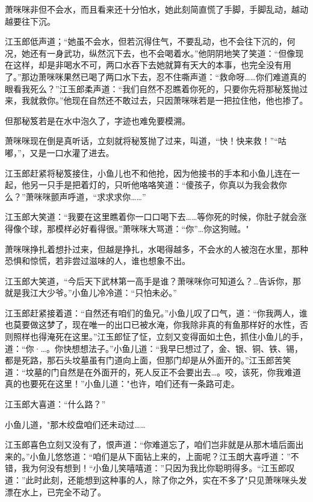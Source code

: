 \documentclass[12pt,oneside]{book}
\begin{document}
萧咪咪非但不会水，而且看来还十分怕水，她此刻简直慌了手脚，手脚乱动，越动越要往下沉。

江玉郎低声道；``她虽不会水，但若沉得住气，不要乱动，也不会往下沉的，何况，她还有一身武功，纵然沉下去，也不会喝着水。''他阴阴地笑了笑道：``但像现在这样，却是非喝水不可，两口水吞下去她就算有天大的本事，也完全没有用了。''那边萧咪咪果然已喝了两口水下去，忍不住嘶声道：``救命呀\ldots\ldots 你们难道真的眼看我死么？''江玉郎柔声道：``我们自然不忍瞧着你死的，只要你先将那秘笈抛过来，我就救你。''他现在自然还不敢过去，只因萧咪咪若是一把拉住他，他也掺了。

但那秘笈若是在水中泡久了，字迹也难免要模溯。

萧咪咪现在倒是真听话，立刻就将秘笈抛了过来，叫道，``快！快来救！''``咕嘟，''，又是一口水灌了进去。

江玉郎赶紧将秘笈接住，小鱼儿也不和他抢，因为他接书的手本和小鱼儿连在一起，他另一只手是把着灯的，只听他咯咯笑道：``傻孩子，你真以为我会救你么？''萧咪咪颤声呼道，``求求求你\ldots\ldots{}''

江玉郎大笑道：``我要在这里瞧着你一口口喝下去\ldots\ldots 等你死的时候，你肚子就会涨得像个球，那模样必好看得很。''萧咪咪大骂道：``你''\ldots 你这狗贼。"

萧咪咪挣扎着想扑过来，但越是挣扎，水喝得越多，不会水的人被泡在水里，那种恐惧和惊慌，若非尝过滋味的人，谁也想象不出。

江玉郎大笑道，``今后天下武林第一高手是谁？萧咪咪你可知道么？\ldots 告诉你，那就是我江大少爷。''小鱼儿冷冷道：``只怕未必。''

江玉郎赶紧接着道：``自然还有咱们的鱼兄。''小鱼儿叹了口气，道：``你我两人，谁也莫要做这梦了，现在唯一的出口已被水淹，你我除非真的有鱼那样好的水性，否则照样也得淹死在这里。''江玉郎怔了怔，立刻又变得面如土色，抓住小鱼儿的手，道：``你·\ldots。你快想想法子。''小鱼儿道：``我早巳想过了，金、银、铜、铁、锡，都是死路，那石头坟墓虽有门道向上面，但那门却是从外面开的。''江玉郎苦笑道：``坟墓的门自然是在外面开的，死人反正不会要出去\ldots。咬，该死，你我难道真的也要死在这里！''小鱼儿道："也许，咱们还有一条路可走。

江玉郎大喜道：``什么路？''

小鱼儿道，"那木绞盘咱们还未动过\ldots\ldots{}

江玉郎喜色立刻又没有了，恨声道：``你难道忘了，咱们岂非就是从那木墙后面出来的。''小鱼儿悠悠道：``咱们是从下面钻上来的，上面呢？江玉朗大喜呼道：''不错，我为何没有想到！``小鱼儿笑嘻嘻道：''只因为我比你聪明得多。``江玉郎叹道：''此时此刻，还能想到这种事的人，除了你之外，实在不多了"只见萧咪咪头发漂在水上，已完全不动了。
\end{document}
